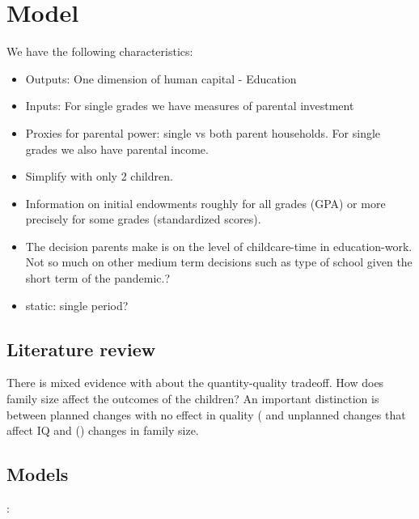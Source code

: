 \documentclass[11pt,a4paper,twoside]{article}
\begin{document}
\section{Model}

We have the following characteristics:

\begin{itemize}
    \item Outputs: One dimension of human capital - Education
    \item Inputs: For single grades we have measures of parental investment
    \item Proxies for parental power: single vs both parent households. For single grades we also have parental income.
    \item Simplify with only 2 children.
    \item Information on initial endowments roughly for all grades (GPA) or more precisely for some grades (standardized scores).
    \item The decision parents make is on the level of childcare-time in education-work. Not so much on other medium term decisions such as type of school given the short term of the pandemic.?
    \item static: single period?
\end{itemize}


\subsection{Literature review}

There is mixed evidence with about the quantity-quality tradeoff. How does family size affect the outcomes of the children? An important distinction is between planned changes with no effect in quality (\cite{black_more_2005} and unplanned changes that affect IQ and  (\cite{black_small_2010}) changes in family size. 



\subsection{Models}

\cite{behrman_parental_1982}: 

\cite{behrman_chapter_1997}

\cite{behrman_parental_2022}

\cite{conti_parental_2022}

\cite{bharadwaj_health_2018}

\cite{rosenzweig_heterogeneity_1988}
\end{document}
